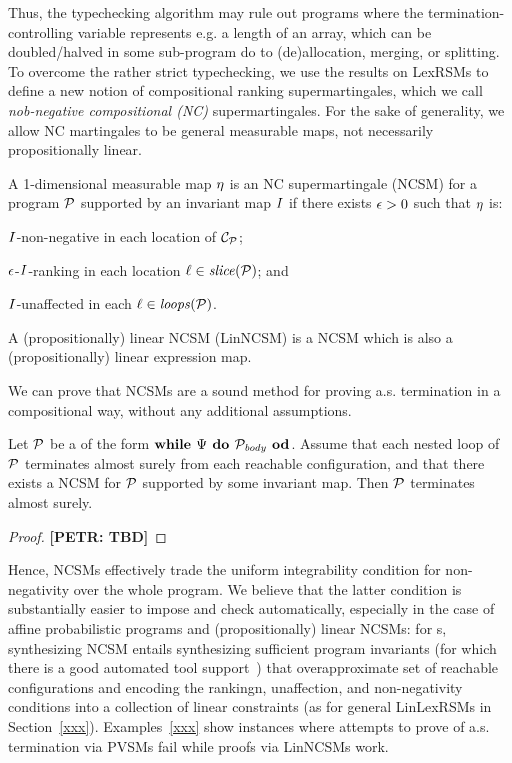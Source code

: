 Thus, the typechecking algorithm may rule out programs where the termination-controlling variable represents e.g. a length of an array, which can be doubled/halved in some sub-program do to (de)allocation, merging, or splitting.
To overcome the rather strict typechecking, we use the results on LexRSMs to define a new notion of compositional ranking supermartingales, which we call \emph{nob-negative compositional (NC)} supermartingales. For the sake of generality, we allow NC martingales to be general measurable maps, not necessarily propositionally linear.

\begin{definition}
\label{def:nonneg-comp}
A 1-dimensional measurable map $\eta$ is an NC supermartingale (NCSM) for a program $\mathcal{P}$ supported by an invariant map $I$ if there exists $\epsilon>0$ such that $\eta$ is:
\begin{compactenum}
\item  $I$-non-negative in each location of $\mathcal{C}_{\mathcal{P}}$;
\item 
 $\epsilon$-$I$-ranking in each location $\ell\in\mathit{slice}{(\mathcal{P})}$; and
\item 
  $I$-unaffected in each $\ell\in\mathit{loops}(\mathcal{P})$.
\end{compactenum}
A (propositionally) linear NCSM (LinNCSM) is a NCSM which is also a (propositionally) linear expression map.
\end{definition}



We can prove that NCSMs are a sound method for proving a.s. termination in a compositional way, without any additional assumptions.

\begin{theorem}
\label{thm:nonneg-comp}
Let $\mathcal{P}$ be a \PP{} of the form $\textbf{while } \Psi \textbf{ do } 
\mathcal{P}_{\mathit{body}} \textbf{ od}$. Assume that each nested loop of $\mathcal{P}$ terminates almost surely from each reachable configuration, and that there exists a NCSM for $\mathcal{P}$ supported by some invariant map. Then $\mathcal{P}$ terminates almost surely.
\end{theorem}
\begin{proof}
\textbf{[PETR: TBD]}
\end{proof}

Hence, NCSMs effectively trade the uniform integrability condition for non-negativity over the whole program. We believe that the latter condition is substantially easier to impose and check automatically, especially in the case of affine probabilistic programs and (propositionally) linear NCSMs: for \APP{}s, synthesizing NCSM entails synthesizing sufficient program invariants (for which there is a good automated tool support~\cite{xxx}) that overapproximate set of reachable configurations and encoding the rankingn, unaffection, and non-negativity conditions into a collection of linear constraints (as for general LinLexRSMs in Section~\ref{xxx}). Examples~\ref{xxx} show instances where attempts to prove of a.s. termination via PVSMs fail while proofs via LinNCSMs work. 

